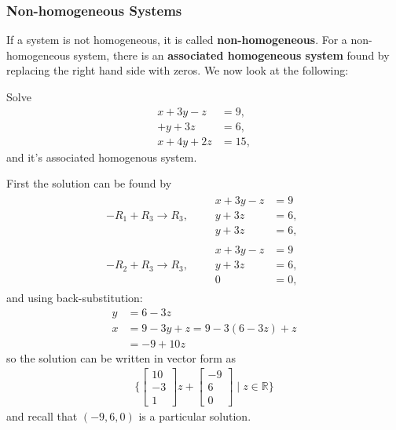 \subsubsection{Non-homogeneous Systems}

If a system is not homogeneous, it is called \textbf{non-homogeneous}.   For a non-homo\-gen\-eous system, there is an \textbf{associated homogeneous system} found by replacing the right hand side with zeros.    We now look at the following:
%
\begin{example} \label{ex:nh:and:homo}
Solve 
%
\begin{align*}
x + 3y -z & = 9, \\
   + y + 3z & = 6, \\
x+4y +2z & = 15,
\end{align*}
and it's associated homogenous system. 

\solution

First the solution can be found by 
%
\begin{align*}
-R_1+R_3 \rightarrow R_3, \qquad
\begin{split}
x + 3y - z & = 9 \\
y + 3z & = 6, \\
y + 3z & = 6, 
\end{split} \\[12pt]
-R_2 + R_3 \rightarrow R_3, \qquad
\begin{split}
x + 3y - z & = 9 \\
y + 3z & = 6, \\
0 & = 0,   
\end{split} 
\end{align*}
and using back-substitution:
%
\begin{align*}
y & = 6-3z\\
x & = 9 -3y + z = 9 - 3(6-3z) + z \\
& = -9 +10z 
\end{align*}
so the solution can be written in vector form as
\begin{align*}
\{ \begin{bmatrix}
10 \\ -3 \\ 1 
\end{bmatrix} z + \begin{bmatrix}
-9 \\ 6 \\ 0 
\end{bmatrix} \; | \; z \in \mathbb{R} \} 
\end{align*} 
and recall that $(-9,6,0)$ is a particular solution.   


\end{example}
